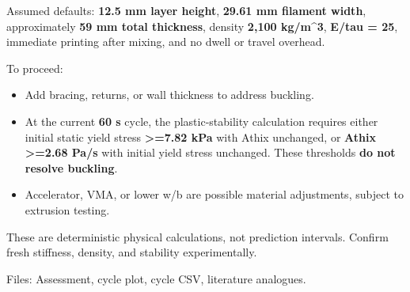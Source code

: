 \begin{agentbox}
\par
Assumed defaults: \textbf{12.5 mm layer height}, \textbf{29.61 mm filament width}, approximately \textbf{59 mm total thickness}, density \textbf{2,100 kg/m\textasciicircum{}3}, \textbf{E/tau = 25}, immediate printing after mixing, and no dwell or travel overhead.\par
\par
To proceed:\par
\begin{itemize}[nosep,leftmargin=1.2em]
\item Add bracing, returns, or wall thickness to address buckling.
\item At the current \textbf{60 s} cycle, the plastic-stability calculation requires either initial static yield stress \textbf{>=7.82 kPa} with Athix unchanged, or \textbf{Athix >=2.68 Pa/s} with initial yield stress unchanged. These thresholds \textbf{do not resolve buckling}.
\item Accelerator, VMA, or lower w/b are possible material adjustments, subject to extrusion testing.
\end{itemize}
These are deterministic physical calculations, not prediction intervals. Confirm fresh stiffness, density, and stability experimentally.\par
\par
Files: Assessment, cycle plot, cycle CSV, literature analogues.\par
\par
\end{agentbox}